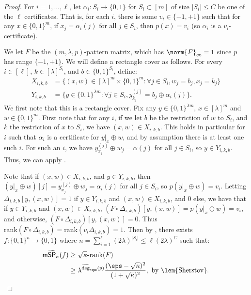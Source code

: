 \documentclass[11pt]{article}
\numberwithin{equation}{section}
\theoremstyle{definition}
\theoremstyle{plain}
\begin{document}
\begin{proof}
For $i=1,\dots,\ell$, let $\alpha_i:S_i\rightarrow\{0,1\}$ for $S_i\subset[m]$ of size $|S_i|\leq C$ be one of the $\ell$ certificates. That is, for each $i$, there is some $v_i\in\{-1,+1\}$ such that for any $x\in\{0,1\}^m$, if $x_j=\alpha_i(j)$ for all $j\in S_i$, then $p(x)=v_i$ (so $\alpha_i$ is a $v_i$-certificate). 

We let $F$ be the $(m,\lambda,p)$-pattern matrix, which has $\norm{F}_\infty=1$ since $p$ has range $\{-1,+1\}$. We will define a rectangle cover as follows. 
For every $i\in[\ell]$, $k\in [\lambda]^{S_i}$, and $b\in\{0,1\}^{S_i}$, define:
\begin{align*}
X_{i,k,b} &= \{(x,w)\in [\lambda]^m\times\{0,1\}^m:\forall j\in S_i, w_j=b_j, x_j=k_j\}\\
Y_{i,k,b} &=\{y\in\{0,1\}^{\lambda m}:\forall j\in S_i, y_{k_j}^{(j)}=b_j\oplus\alpha_i(j)\}.
\end{align*}
We first note that this is a rectangle cover. Fix any $y\in\{0,1\}^{\lambda m}$, $x\in[\lambda]^m$ and $w\in\{0,1\}^m$.
First note that for any $i$, if we let $b$ be the restriction of $w$ to $S_i$, and $k$ the restriction of $x$ to $S_i$, we have $(x,w)\in X_{i,k,b}$. This holds in particular for $i$ such that $\alpha_i$ is a certificate for $y|_x\oplus w$, and by assumption there is at least one such $i$. For such an $i$, we have $y^{(j)}_{x_j}\oplus w_j=\alpha(j)$ for all $j\in S_i$, so $y\in Y_{i,k,b}$. Thus, we can apply . 


Note that if $(x,w)\in X_{i,k,b}$, and $y\in Y_{i,k,b}$, then $(y|_x\oplus w)[j]=y^{(j)}_{x_j}\oplus w_j=\alpha_i(j)$ for all $j\in S_i$, so $p(y|_x\oplus w)=v_i$.
Letting $\Delta_{i,k,b}[y,(x,w)]=1$ if $y\in Y_{i,k,b}$ and $(x,w)\in X_{i,k,b}$, and 0 else, we have that if $y\in Y_{i,k,b}$ and $(x,w)\in X_{i,k,b}$, $(F\circ\Delta_{i,k,b})[y,(x,w)]=p(y|_x\oplus w)=v_i$, and otherwise, $(F\circ\Delta_{i,k,b})[y,(x,w)]=0$.
Thus $\mathrm{rank}(F\circ\Delta_{i,k,b})=\mathrm{rank}(v_i\Delta_{i,k,b})=1$. 
Then by , there exists $f:\{0,1\}^n\rightarrow\{0,1\}$ where $n=\sum_{i=1}^{\ell}(2\lambda)^{|S_i|}\leq \ell (2\lambda)^C$ such that:
\begin{align*}
\mathsf{m}\widetilde{\mathsf{SP}}_{\kappa}(f) &\geq \sqrt{\kappa}\mbox{-rank}(F)\\
&\geq \lambda^{\widetilde{\deg}_\eps(p)}\frac{(\eps-\sqrt{\kappa})^2}{(1+\sqrt{\kappa})^2}, \mbox{ by \lem{Sherstov}.}\qedhere
\end{align*}
\end{proof}
\end{document}
